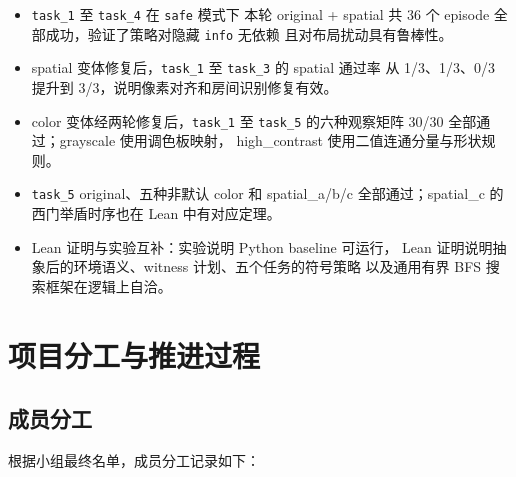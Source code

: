 \documentclass[12pt,a4paper]{ctexart}
\begin{document}
\begin{itemize}[leftmargin=2em]
  \item \texttt{task\_1} 至 \texttt{task\_4} 在 \texttt{safe} 模式下
  本轮 original + spatial 共 36 个 episode 全部成功，验证了策略对隐藏 \texttt{info} 无依赖
  且对布局扰动具有鲁棒性。
  \item spatial 变体修复后，\texttt{task\_1} 至 \texttt{task\_3} 的 spatial 通过率
  从 1/3、1/3、0/3 提升到 3/3，说明像素对齐和房间识别修复有效。
  \item color 变体经两轮修复后，\texttt{task\_1} 至 \texttt{task\_5}
  的六种观察矩阵 30/30 全部通过；grayscale 使用调色板映射，
  high\_contrast 使用二值连通分量与形状规则。
  \item \texttt{task\_5} original、五种非默认 color 和
  spatial\_a/b/c 全部通过；spatial\_c 的西门举盾时序也在 Lean 中有对应定理。
  \item Lean 证明与实验互补：实验说明 Python baseline 可运行，
  Lean 证明说明抽象后的环境语义、witness 计划、五个任务的符号策略
  以及通用有界 BFS 搜索框架在逻辑上自洽。
\end{itemize}

\section{项目分工与推进过程}

\subsection{成员分工}

根据小组最终名单，成员分工记录如下：
\end{document}
